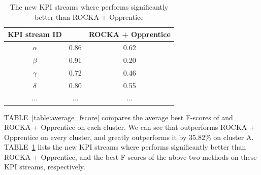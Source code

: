 
\begin{table}
\caption{ The new KPI streams where \name{} performs significantly better than ROCKA + Opprentice }
\label{table:difference_fscore}
\begin{center}
\begin{tabular}{| c | c | c |}
\hline
\textbf{KPI stream ID} & \textbf{\name{}} & \textbf{ROCKA + Opprentice} \\ \hline
$\alpha$ & 0.86 & 0.62 \\ \hline
$\beta$ & 0.91 & 0.20 \\ \hline
$\gamma $ & 0.72 & 0.46 \\ \hline
$\delta $ & 0.80 & 0.55 \\ \hline
... & ... & ... \\
\hline
\end{tabular}
\end{center}
\vspace{-6 mm}
\end{table}

TABLE~\ref{table:average_fscore} compares the average best F-scores of \name{} and ROCKA + Opprentice on each cluster. 
We can see that \name{} outperforms ROCKA + Opprentice on every cluster, and greatly outperforms it by 35.82\% on cluster A. 
TABLE~\ref{table:difference_fscore} lists the new KPI streams where \name{} performs significantly better than ROCKA + Opprentice, and the best F-scores of the above two methods on these KPI streams, respectively.

